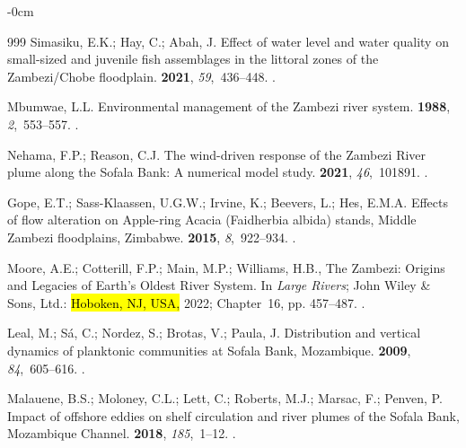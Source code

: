 \documentclass[coasts,article,accept,pdftex,oneauthor]{Definitions/mdpi}
\begin{document}
\begin{adjustwidth}{-\extralength}{0cm}
\begin{thebibliography}{999}
Simasiku, E.K.; Hay, C.; Abah, J.
\newblock Effect of water level and water quality on small-sized and juvenile
  fish assemblages in the littoral zones of the Zambezi/Chobe floodplain.
 {\bf 2021}, {\em 59},~436--448.
.

Mbumwae, L.L.
\newblock Environmental management of the Zambezi river system.
 {\bf 1988}, {\em
  2},~553--557.
.

Nehama, F.P.; Reason, C.J.
\newblock The wind-driven response of the Zambezi River plume along the Sofala
  Bank: A numerical model study.
 {\bf 2021}, {\em
  46},~101891.
.

Gope, E.T.; Sass-Klaassen, U.G.W.; Irvine, K.; Beevers, L.; Hes, E.M.A.
\newblock Effects of flow alteration on Apple-ring Acacia (Faidherbia albida)
  stands, Middle Zambezi floodplains, Zimbabwe.
 {\bf 2015}, {\em 8},~922--934.
.

Moore, A.E.; Cotterill, F.P.; Main, M.P.; Williams, H.B., The Zambezi: Origins
  and Legacies of Earth's Oldest River System.
\newblock In {\em Large Rivers}; John Wiley \& Sons, Ltd.:  \hl{Hoboken, NJ, USA,}   2022; Chapter~16,
  pp. 457--487.
.

Leal, M.; Sá, C.; Nordez, S.; Brotas, V.; Paula, J.
\newblock Distribution and vertical dynamics of planktonic communities at
  Sofala Bank, Mozambique.
 {\bf 2009}, {\em
  84},~605--616.
.

Malauene, B.S.; Moloney, C.L.; Lett, C.; Roberts, M.J.; Marsac, F.; Penven, P.
\newblock Impact of offshore eddies on shelf circulation and river plumes of
  the Sofala Bank, Mozambique Channel.
 {\bf 2018}, {\em 185},~1--12.
.


\end{thebibliography}
\end{adjustwidth}
\end{document}
